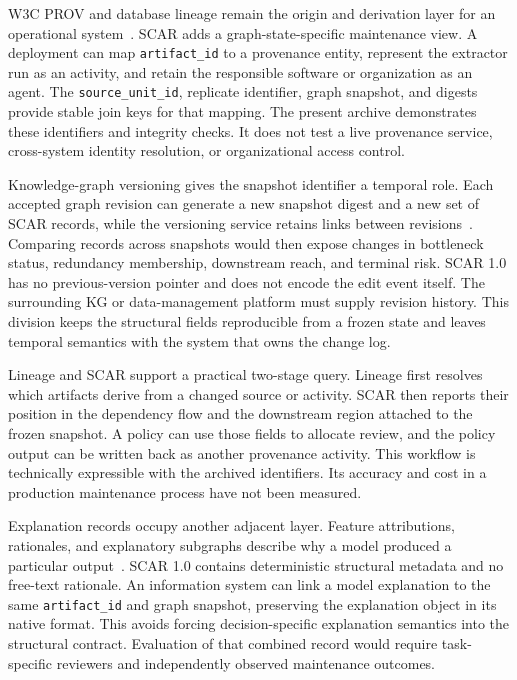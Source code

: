 \documentclass[pdflatex,sn-basic]{sn-jnl}
\begin{document}
W3C PROV and database lineage remain the origin and derivation layer for an operational system~\citep{cheney2009provenance,lebo2013prov}. SCAR adds a graph-state-specific maintenance view. A deployment can map \texttt{artifact\_id} to a provenance entity, represent the extractor run as an activity, and retain the responsible software or organization as an agent. The \texttt{source\_unit\_id}, replicate identifier, graph snapshot, and digests provide stable join keys for that mapping. The present archive demonstrates these identifiers and integrity checks. It does not test a live provenance service, cross-system identity resolution, or organizational access control.

Knowledge-graph versioning gives the snapshot identifier a temporal role. Each accepted graph revision can generate a new snapshot digest and a new set of SCAR records, while the versioning service retains links between revisions~\citep{ma2023temporalrdf,slifka2023evolvable}. Comparing records across snapshots would then expose changes in bottleneck status, redundancy membership, downstream reach, and terminal risk. SCAR 1.0 has no previous-version pointer and does not encode the edit event itself. The surrounding KG or data-management platform must supply revision history. This division keeps the structural fields reproducible from a frozen state and leaves temporal semantics with the system that owns the change log.

Lineage and SCAR support a practical two-stage query. Lineage first resolves which artifacts derive from a changed source or activity. SCAR then reports their position in the dependency flow and the downstream region attached to the frozen snapshot. A policy can use those fields to allocate review, and the policy output can be written back as another provenance activity. This workflow is technically expressible with the archived identifiers. Its accuracy and cost in a production maintenance process have not been measured.

Explanation records occupy another adjacent layer. Feature attributions, rationales, and explanatory subgraphs describe why a model produced a particular output~\citep{arrieta2020explainable,miller2019explanation,ying2019gnnexplainer}. SCAR 1.0 contains deterministic structural metadata and no free-text rationale. An information system can link a model explanation to the same \texttt{artifact\_id} and graph snapshot, preserving the explanation object in its native format. This avoids forcing decision-specific explanation semantics into the structural contract. Evaluation of that combined record would require task-specific reviewers and independently observed maintenance outcomes.
\end{document}
